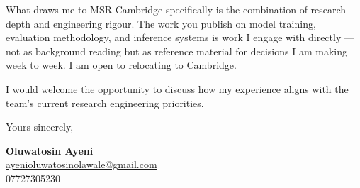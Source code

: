 \documentclass[11pt,a4paper]{moderncv}
\begin{document}
What draws me to MSR Cambridge specifically is the combination of research depth and engineering rigour. The work you publish on model training, evaluation methodology, and inference systems is work I engage with directly — not as background reading but as reference material for decisions I am making week to week. I am open to relocating to Cambridge.

I would welcome the opportunity to discuss how my experience aligns with the team's current research engineering priorities.

Yours sincerely,

\textbf{Oluwatosin Ayeni}\\
\href{mailto:ayenioluwatosinolawale@gmail.com}{ayenioluwatosinolawale@gmail.com}\\
07727305230
\end{document}
